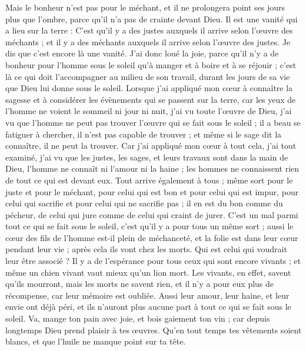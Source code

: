 \begin{multicols}{2}
Mais le bonheur n’est pas pour le méchant, et il ne prolongera point ses jours plus que l'ombre, parce qu'il n’a pas de crainte devant Dieu.
Il est une vanité qui a lieu sur la terre : C'est qu'il y a des justes auxquels il arrive selon l'œuvre des méchants ; et il y a des méchants auxquels il arrive selon l'œuvre des justes. Je dis que c’est encore là une vanité.
J'ai donc loué la joie, parce qu'il n'y a de bonheur pour l’homme sous le soleil qu’à manger et à boire et à se réjouir ; c'est là ce qui doit l’accompagner au milieu de son travail, durant les jours de sa vie que Dieu lui donne sous le soleil.
Lorsque j’ai appliqué mon cœur à connaître la sagesse et à considérer les évènements qui se passent sur la terre, car les yeux de l’homme ne voient le sommeil ni jour ni nuit,
j’ai vu toute l'œuvre de Dieu, j’ai vu que l'homme ne peut pas trouver l'œuvre qui se fait sous le soleil ; il a beau se fatiguer à chercher, il n’est pas capable de trouver ; et même si le sage dit la connaître, il ne peut la trouver.
\VerseOne{}Car j'ai appliqué mon cœur à tout cela, j’ai tout examiné, j’ai vu que les justes, les sages, et leurs travaux sont dans la main de Dieu, l’homme ne connaît ni l’amour ni la haine ; les hommes ne connaissent rien de tout ce qui est devant eux.
Tout arrive également à tous ; même sort pour le juste et pour le méchant, pour celui qui est bon et pour celui qui est impur, pour celui qui sacrifie et pour celui qui ne sacrifie pas ; il en est du bon comme du pécheur, de celui qui jure comme de celui qui craint de jurer.
C'est un mal parmi tout ce qui se fait sous le soleil, c’est qu’il y a pour tous un même sort ; aussi le cœur des fils de l’homme est-il plein de méchanceté, et la folie est dans leur cœur pendant leur vie ; après cela ils vont chez les morts. Qui est celui qui voudrait leur être associé ?
Il y a de l'espérance pour tous ceux qui sont encore vivants ; et même un chien vivant vaut mieux qu'un lion mort.
Les vivants, en effet, savent qu'ils mourront, mais les morts ne savent rien, et il n’y a pour eux plus de récompense, car leur mémoire est oubliée.
Aussi leur amour, leur haine, et leur envie ont déjà péri, et ils n'auront plus aucune part à tout ce qui se fait sous le soleil.
Va, mange ton pain avec joie, et bois gaiement ton vin ; car depuis longtemps Dieu prend plaisir à tes œuvres.
Qu’en tout temps tes vêtements soient blancs, et que l’huile ne manque point sur ta tête.

\end{multicols}
